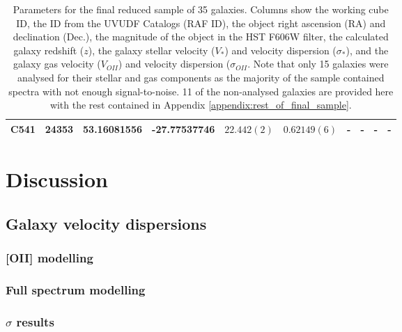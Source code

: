 \documentclass[12pt, twocolumn]{revtex4-1}    %
\begin{document}
\begin{table}
\begin{tabular}{c@{\hskip 10pt}c@{\hskip 10pt}c@{\hskip 10pt}c@{\hskip 10pt}c@{\hskip 10pt}c@{\hskip 10pt}c@{\hskip 10pt}c@{\hskip 10pt}c@{\hskip 10pt}c}
C541 & 24353 & 53.16081556 & -27.77537746 & $22.442(2)$ & $0.62149(6)$ & - & - & - & - \\ 
 \hline
\end{tabular}
\caption{Parameters for the final reduced sample of 35 galaxies. Columns show the working cube ID, the ID from the UVUDF Catalogs \citep{2015AJ....150...31R} (RAF ID), the object right ascension (RA) and declination (Dec.), the magnitude of the object in the HST F606W filter, the calculated galaxy redshift ($z$), the galaxy stellar velocity ($V_*$) and velocity dispersion ($\sigma_*$), and the galaxy gas velocity ($V_{OII}$) and velocity dispersion ($\sigma_{OII}$. Note that only 15 galaxies were analysed for their stellar and gas components as the majority of the sample contained spectra with not enough signal-to-noise. 11 of the non-analysed galaxies are provided here with the rest contained in Appendix \ref{appendix:rest_of_final_sample}.}
\label{table:final_sample}
\end{table}

\twocolumngrid

\vspace{2ex} %
\section{Discussion}
\subsection{Galaxy velocity dispersions}
\noindent

\vspace{2ex} %
\subsubsection{[OII] modelling}
\noindent

\vspace{2ex} %
\subsubsection{Full spectrum modelling}
\noindent

\vspace{2ex} %
\subsubsection{$\sigma$ results}
\noindent
\end{document}
